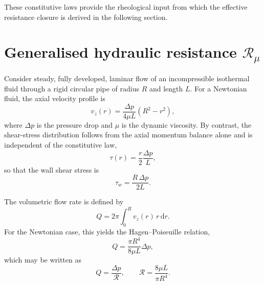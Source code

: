 \documentclass[lineno]{jfm}
\begin{document}
These constitutive laws provide the rheological input from which the effective resistance closure is derived in the following section.

\section{Generalised hydraulic resistance \texorpdfstring{$\mathcal{R}_{\mu}$}{Rmu}}
\label{sec:Rmu}

Consider steady, fully developed, laminar flow of an incompressible isothermal fluid through a rigid circular pipe of radius $R$ and length $L$. For a Newtonian fluid, the axial velocity profile is
\begin{equation}
v_z(r)=\frac{\Delta p}{4\mu L}(R^2-r^2),
\label{eq:v_newton}
\end{equation}
where $\Delta p$ is the pressure drop and $\mu$ is the dynamic viscosity. By contrast, the shear-stress distribution follows from the axial momentum balance alone and is independent of the constitutive law,
\begin{equation}
\tau(r)=\frac{r}{2}\frac{\Delta p}{L},
\label{eq:tau_dist}
\end{equation}
so that the wall shear stress is
\begin{equation}
\tau_w=\frac{R\,\Delta p}{2L}.
\label{eq:tau_w}
\end{equation}

The volumetric flow rate is defined by
\begin{equation}
Q=2\pi\int_{0}^{R}v_z(r)\,r\,\mathrm{d}r.
\label{eq:Q_def}
\end{equation}
For the Newtonian case, this yields the Hagen--Poiseuille relation,
\[
Q=\frac{\pi R^4}{8\mu L}\Delta p,
\]
which may be written as
\[
Q=\frac{\Delta p}{\mathcal{R}},
\qquad
\mathcal{R}=\frac{8\mu L}{\pi R^4}.
\]
\end{document}
